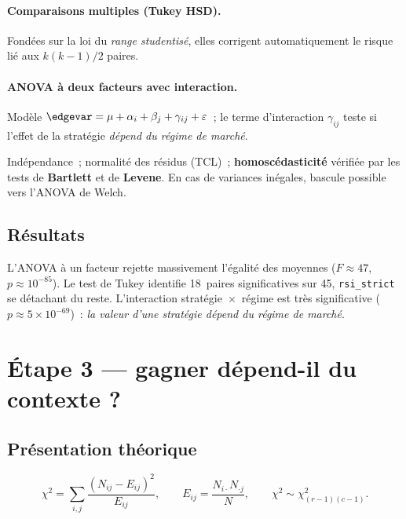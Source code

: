 \paragraph{Comparaisons multiples (Tukey HSD).}
Fondées sur la loi du \emph{range studentisé}, elles corrigent
automatiquement le risque lié aux $k(k-1)/2$ paires.

\paragraph{ANOVA à deux facteurs avec interaction.}
Modèle \(\edgevar = \mu + \alpha_i + \beta_j + \gamma_{ij} + \varepsilon\)~;
le terme d'interaction \(\gamma_{ij}\) teste si l'effet de la stratégie
\emph{dépend du régime de marché}.

\begin{conditions}
Indépendance~; normalité des résidus (TCL)~; \textbf{homoscédasticité}
vérifiée par les tests de \textbf{Bartlett} et de \textbf{Levene}. En cas
de variances inégales, bascule possible vers l'ANOVA de Welch.
\end{conditions}

\subsection{Résultats}
L'ANOVA à un facteur rejette massivement l'égalité des moyennes
(\(F\approx 47\), \(p\approx 10^{-85}\)). Le test de Tukey identifie
18~paires significatives sur 45, \texttt{rsi\_strict} se détachant du
reste. L'interaction stratégie~$\times$~régime est très significative
(\(p\approx 5\times10^{-69}\))~: \emph{la valeur d'une stratégie dépend
du régime de marché}.

\section{Étape 3 --- gagner dépend-il du contexte ?}
\label{sec:b1-etape3}

\subsection{Présentation théorique}
\[
  \chi^2 = \sum_{i,j}\frac{(N_{ij}-E_{ij})^2}{E_{ij}},
  \qquad E_{ij}=\frac{N_{i\cdot}N_{\cdot j}}{N},
  \qquad \chi^2 \sim \chi^2_{(r-1)(c-1)}.
\]

